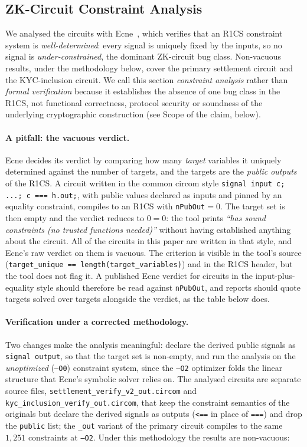 \documentclass[11pt]{article}
\newcommand{\code}[1]{\texttt{#1}}
\begin{document}
\subsection{ZK-Circuit Constraint Analysis}
\label{sec:formalver}
We analysed the circuits with Ecne~\cite{ecne}, which verifies that an R1CS
constraint system is \emph{well-determined}: every signal is uniquely fixed by
the inputs, so no signal is \emph{under-constrained}, the dominant ZK-circuit
bug class. Non-vacuous results, under the methodology below, cover the primary
settlement circuit and the KYC-inclusion circuit. We call this section
\emph{constraint analysis} rather than \emph{formal verification} because it
establishes the absence of one bug class in the R1CS, not functional
correctness, protocol security or soundness of the underlying cryptographic
construction (see Scope of the claim, below).

\paragraph{A pitfall: the vacuous verdict.}
Ecne decides its verdict by comparing how many \emph{target} variables it
uniquely determined against the number of targets, and the targets are the
\emph{public outputs} of the R1CS. A circuit written in the common circom style
\code{signal input c; ...; c === h.out;}, with public values declared as inputs
and pinned by an equality constraint, compiles to an R1CS with
\code{nPubOut}${}=0$. The target set is then empty and the verdict reduces to
$0=0$: the tool prints \emph{``has sound constraints (no trusted functions
needed)''} without having established anything about the circuit. All of the
circuits in this paper are written in that style, and Ecne's raw verdict on
them is vacuous. The criterion is visible in the tool's source
(\code{target\_unique == length(target\_variables)}) and in the R1CS header,
but the tool does not flag it. A published Ecne verdict for circuits in the
input-plus-equality style should therefore be read against \code{nPubOut}, and
reports should quote targets solved over targets alongside the verdict, as the
table below does.

\paragraph{Verification under a corrected methodology.}
Two changes make the analysis meaningful: declare the derived public signals as
\code{signal output}, so that the target set is non-empty, and run the analysis
on the \emph{unoptimized} (\code{--O0}) constraint system, since the \code{--O2}
optimizer folds the linear structure that Ecne's symbolic solver relies on. The
analysed circuits are separate source files,
\code{settlement\_verify\_v2\_out.circom} and
\code{kyc\_inclusion\_verify\_out.circom}, that keep the constraint semantics of
the originals but declare the derived signals as outputs (\code{<==} in place of
\code{===}) and drop the \code{public} list; the \code{\_out} variant of the
primary circuit compiles to the same $1{,}251$ constraints at \code{--O2}. Under
this methodology the results are non-vacuous:
\end{document}
